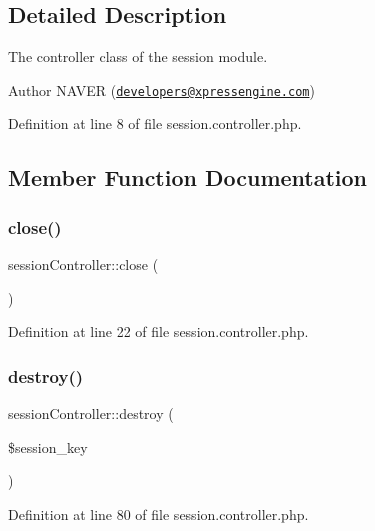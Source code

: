 \subsection{Detailed Description}
The controller class of the session module. 

\begin{DoxyAuthor}{Author}
N\+A\+V\+ER (\href{mailto:developers@xpressengine.com}{\tt developers@xpressengine.\+com}) 
\end{DoxyAuthor}


Definition at line 8 of file session.\+controller.\+php.



\subsection{Member Function Documentation}
\mbox{\label{classsessionController_af48b21176f7a2d12c859bb8421e04f82}} 
\subsubsection{\texorpdfstring{close()}{close()}}
{\footnotesize\ttfamily session\+Controller\+::close (\begin{DoxyParamCaption}{ }\end{DoxyParamCaption})}



Definition at line 22 of file session.\+controller.\+php.

\mbox{\label{classsessionController_a695f52cca73bf4fc0efb1d35a79023c6}} 
\subsubsection{\texorpdfstring{destroy()}{destroy()}}
{\footnotesize\ttfamily session\+Controller\+::destroy (\begin{DoxyParamCaption}\item[{}]{\$session\+\_\+key }\end{DoxyParamCaption})}



Definition at line 80 of file session.\+controller.\+php.

